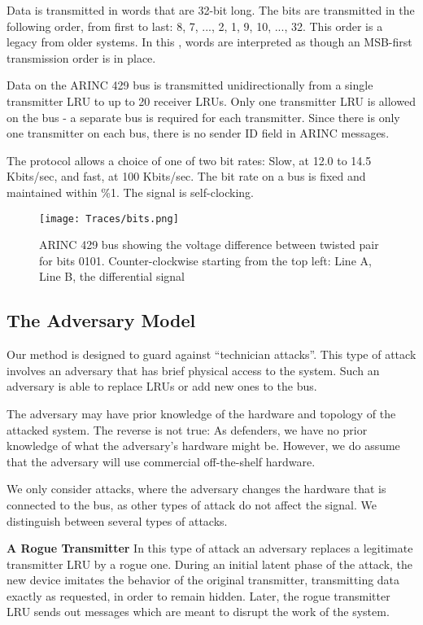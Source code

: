 \documentclass[english]{llncs}
\newcommand{\sublevel}[1]{\subsection{#1}}
\newcommand{\sublevel}[1]{\section{#1}}
\begin{document}
  Data is transmitted in words that are 32-bit long. The bits are transmitted in the following order, from first to last: 8, 7, ..., 2, 1, 9, 10, ..., 32. This order is a legacy from older systems. In this \iftoggle{paper} {paper} {work}, words are interpreted as though an MSB-first transmission order is in place.
  
  Data on the ARINC 429 bus is transmitted unidirectionally from a single transmitter LRU to up to 20 receiver LRUs. Only one transmitter LRU is allowed on the bus - a separate bus is required for each transmitter. Since there is only one transmitter on each bus, there is no sender ID field in ARINC messages.
   
  The protocol allows a choice of one of two bit rates: Slow, at 12.0 to 14.5 Kbits/sec, and fast, at 100 Kbits/sec. The bit rate on a bus is fixed and maintained within \%1. The signal is self-clocking.
  
  
  \begin{figure}[t]
    \centering
    \texttt{[image: Traces/bits.png]}
    \caption{ARINC 429 bus showing the voltage difference between twisted pair for bits 0101. Counter-clockwise starting from the top left: Line A, Line B, the differential signal}
    \label{fig:word_example}
    \centering
  \end{figure}

\vspace*{-2ex} %
\sublevel{The Adversary Model}
  Our method is designed to guard against ``technician attacks''. This type of attack involves an adversary that has brief physical access to the system. Such an adversary is able to replace LRUs or add new ones to the bus.
  
  The adversary may have prior knowledge of the hardware and topology of the attacked system. The reverse is not true: As defenders, we have no prior knowledge of what the adversary's hardware might be. However, we do assume that the adversary will use commercial off-the-shelf hardware.
  
  We only consider attacks, where the adversary changes the hardware that is connected to the bus, as other types of attack do not affect the signal. %
  We distinguish between several types of attacks.

  \textbf{A Rogue Transmitter}
  In this type of attack an adversary replaces a legitimate transmitter LRU by a rogue one. During an initial latent phase of the attack, the new device imitates the behavior of the original transmitter, transmitting data exactly as requested, in order to remain hidden. 
  Later,
  the rogue transmitter LRU sends out messages which are meant to disrupt the work of the system.
  
\end{document}
